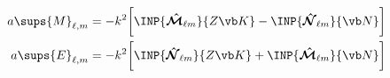\begin{subequations}
\begin{align}
a\sups{M}_{\ell,m}
 &= -k^2\bigg[ \INP{ \BMMInt_{\ell m} }{Z\vb K}
              -\INP{ \BNNInt_{\ell m} }{\vb N}
        \bigg]
\\
a\sups{E}_{\ell,m}
 &= -k^2\bigg[  \INP{ \BNNInt_{\ell m} }{Z\vb K}
               +\INP{ \BMMInt_{\ell m} }{\vb N}
        \bigg]
\end{align}
\label{SphericalMultipolesFromKN}
\end{subequations}

\newpage
